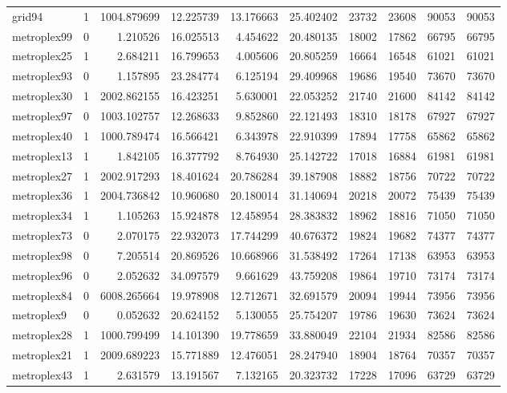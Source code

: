 \begin{longtable}{|l|r|r|r|r|r|r|r|r|r|}
grid94 & 1 & 1004.879699 & 12.225739 & 13.176663 & 25.402402 & 23732 & 23608 & 90053 & 90053 \\
metroplex99 & 0 & 1.210526 & 16.025513 & 4.454622 & 20.480135 & 18002 & 17862 & 66795 & 66795 \\
metroplex25 & 1 & 2.684211 & 16.799653 & 4.005606 & 20.805259 & 16664 & 16548 & 61021 & 61021 \\
metroplex93 & 0 & 1.157895 & 23.284774 & 6.125194 & 29.409968 & 19686 & 19540 & 73670 & 73670 \\
metroplex30 & 1 & 2002.862155 & 16.423251 & 5.630001 & 22.053252 & 21740 & 21600 & 84142 & 84142 \\
metroplex97 & 0 & 1003.102757 & 12.268633 & 9.852860 & 22.121493 & 18310 & 18178 & 67927 & 67927 \\
metroplex40 & 1 & 1000.789474 & 16.566421 & 6.343978 & 22.910399 & 17894 & 17758 & 65862 & 65862 \\
metroplex13 & 1 & 1.842105 & 16.377792 & 8.764930 & 25.142722 & 17018 & 16884 & 61981 & 61981 \\
metroplex27 & 1 & 2002.917293 & 18.401624 & 20.786284 & 39.187908 & 18882 & 18756 & 70722 & 70722 \\
metroplex36 & 1 & 2004.736842 & 10.960680 & 20.180014 & 31.140694 & 20218 & 20072 & 75439 & 75439 \\
metroplex34 & 1 & 1.105263 & 15.924878 & 12.458954 & 28.383832 & 18962 & 18816 & 71050 & 71050 \\
metroplex73 & 0 & 2.070175 & 22.932073 & 17.744299 & 40.676372 & 19824 & 19682 & 74377 & 74377 \\
metroplex98 & 0 & 7.205514 & 20.869526 & 10.668966 & 31.538492 & 17264 & 17138 & 63953 & 63953 \\
metroplex96 & 0 & 2.052632 & 34.097579 & 9.661629 & 43.759208 & 19864 & 19710 & 73174 & 73174 \\
metroplex84 & 0 & 6008.265664 & 19.978908 & 12.712671 & 32.691579 & 20094 & 19944 & 73956 & 73956 \\
metroplex9 & 0 & 0.052632 & 20.624152 & 5.130055 & 25.754207 & 19786 & 19630 & 73624 & 73624 \\
metroplex28 & 1 & 1000.799499 & 14.101390 & 19.778659 & 33.880049 & 22104 & 21934 & 82586 & 82586 \\
metroplex21 & 1 & 2009.689223 & 15.771889 & 12.476051 & 28.247940 & 18904 & 18764 & 70357 & 70357 \\
metroplex43 & 1 & 2.631579 & 13.191567 & 7.132165 & 20.323732 & 17228 & 17096 & 63729 & 63729 \\

\end{longtable}
